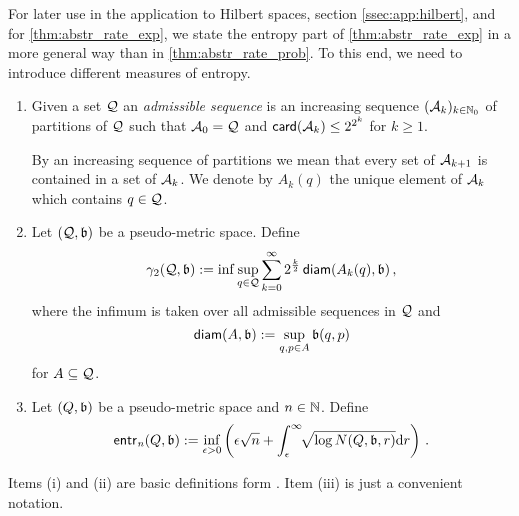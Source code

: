 %
For later use in the application to Hilbert spaces, section \ref{ssec:app:hilbert}, and for \autoref{thm:abstr_rate_exp}, we state the entropy part of \autoref{thm:abstr_rate_exp} in a more general way than in \autoref{thm:abstr_rate_prob}. To this end, we need to introduce different measures of entropy. 
%
\begin{definition}\label{chaining:def_entropy}
\theoremContentInNewLine
\begin{enumerate}[label=\environmentEnumerateLabel]
\item 
	Given a set $\mathcal{Q}$ an \emph{admissible sequence} is an increasing
	sequence $(\mathcal{A}_k)_{k\in\mathbb{N}_0}$ of partitions of $\mathcal{Q}$ such that $\mathcal{A}_0 = \mathcal{Q}$ and $\mathsf{card}(\mathcal{A}_k) \leq 2^{2^k}$ for $k\geq 1$.
	
	By an increasing sequence of partitions we mean that every set of $\mathcal{A}_{k+1}$ is
	contained in a set of $\mathcal{A}_k$. We denote by $A_k(q)$ the unique
	element of $\mathcal{A}_k$ which contains $q\in\mathcal{Q}$.
\item
	Let $(\mathcal{Q}, \mathfrak{b})$ be a pseudo-metric space.
	Define 
	\begin{equation*}
		\gamma_2(\mathcal{Q}, \mathfrak{b}) := \inf \sup_{q\in\mathcal{Q}}\sum_{k=0}^\infty 2^{\frac k2} \operatorname{\mathsf{diam}}(A_k(q), \mathfrak{b})\, ,
	\end{equation*}
	where the infimum is taken over all admissible sequences in $\mathcal{Q}$ and
	\begin{equation*}
		\operatorname{\mathsf{diam}}(A, \mathfrak{b}) := \sup_{q,p\in A} \mathfrak{b}(q,p)
	\end{equation*}
	for $A\subseteq \mathcal{Q}$.
\item 
	Let $(Q, \mathfrak{b})$ be a pseudo-metric space and $n \in \mathbb{N}$.
	Define 
	\begin{equation*}
		\operatorname{\mathsf{entr}_\mathit{n}}(Q, \mathfrak{b}) :=  \inf_{\epsilon > 0} \left( \epsilon \sqrt{n} + \int_\epsilon^\infty \!\! \sqrt{\log N(Q, \mathfrak{b}, r)}\mathrm{d} r \right) 
		\, .
	\end{equation*}
\end{enumerate}
\end{definition}
%
Items (i) and (ii) are basic definitions form \cite{talagrand14}. Item (iii) is just a convenient notation.
%
